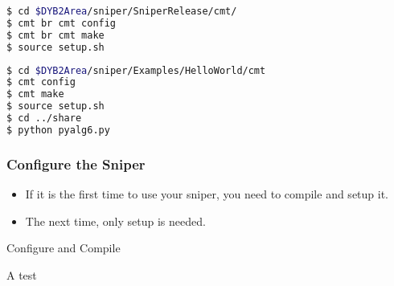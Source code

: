 \newsavebox{\installsniper}
\begin{lrbox}{\installsniper}
\begin{lstlisting}[language=bash]
$ cd $DYB2Area/sniper/SniperRelease/cmt/
$ cmt br cmt config
$ cmt br cmt make
$ source setup.sh
\end{lstlisting}
\end{lrbox}
\newsavebox{\testsniper}
\begin{lrbox}{\testsniper}
\begin{lstlisting}[language=bash]
$ cd $DYB2Area/sniper/Examples/HelloWorld/cmt
$ cmt config
$ cmt make
$ source setup.sh
$ cd ../share
$ python pyalg6.py
\end{lstlisting}
\end{lrbox}

\begin{frame}
    \frametitle{Configure the Sniper}
    \begin{itemize}
        \item If it is the first time to 
                use your sniper, you need to
                compile and setup it.
        \item The next time, only setup is needed.
    \end{itemize}
    \begin{block}{Configure and Compile}
        \par\usebox{\installsniper}
    \end{block}
    \begin{block}{A test}
        \par\usebox{\testsniper}
    \end{block}
\end{frame}

